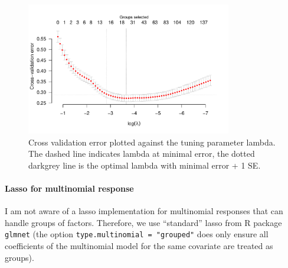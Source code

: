 \documentclass[11pt,a4paper,twoside]{article}\usepackage[]{graphicx}\usepackage[]{color}
\newenvironment{knitrout}{}{} %
\begin{document}
\begin{knitrout}
\color{fgcolor}\begin{figure}

{\centering \includegraphics[width=0.8\textwidth]{figure/lasso-plot-cv-1} 

}

\caption[Cross validation error plotted against the tuning parameter lambda]{Cross validation error plotted against the tuning parameter lambda. The dashed line indicates lambda at minimal error, the dotted darkgrey line is the optimal lambda with minimal error + 1 SE.}\label{fig:lasso-plot-cv}
\end{figure}


\end{knitrout}


\paragraph{Lasso for multinomial response} \mbox{} \nolinebreak

I am not aware of a lasso implementation for multinomial responses 
that can handle groups of factors. Therefore, we use ``standard'' lasso from R package \texttt{glmnet} (the option \texttt{type.multinomial = "grouped"} does only ensure all coefficients of the multinomial model for the same covariate are treated as groups). 
\end{document}
